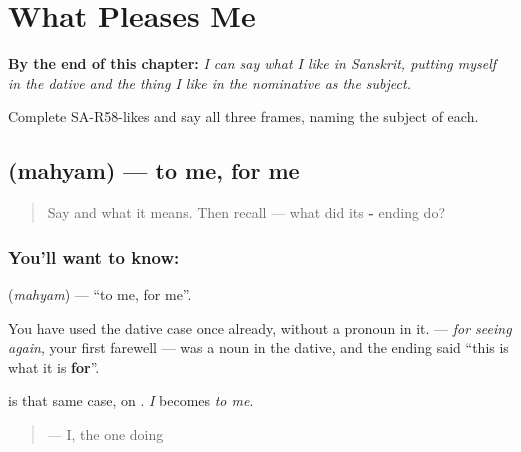 
\chapter{What Pleases Me}
\label{ch:sa-what-pleases-me}

\begin{chapteropening}
\textbf{By the end of this chapter:} \emph{I can say what I like in Sanskrit, putting myself in the dative and the thing I like in the nominative as the subject.}

Complete SA-R58-likes and say all three frames, naming the subject of each.
\end{chapteropening}

\section[\texorpdfstring{\sk{मह्यम्} (mahyam)}{मह्यम् (mahyam)}]{ (mahyam) — to me, for me}

\label{lesson:SA-C58-mahyam}



\begin{quote}
Say \textbf{} and what it means. Then recall \textbf{} — what did its \textbf{-} ending do?
\end{quote}

\subsection*{You'll want to know: }
\textbf{} (\emph{mahyam}) — \textquotedblleft{}to me, for me\textquotedblright{}.

You have used the dative case once already, without a pronoun in it. \textbf{} — \emph{for seeing again}, your first farewell — was a noun in the dative, and the ending said \textquotedblleft{}this is what it is \textbf{for}\textquotedblright{}.

\textbf{} is that same case, on \textbf{}. \emph{I} becomes \emph{to me}.

\begin{quote}
\textbf{} — I, the one doing
\end{quote}

